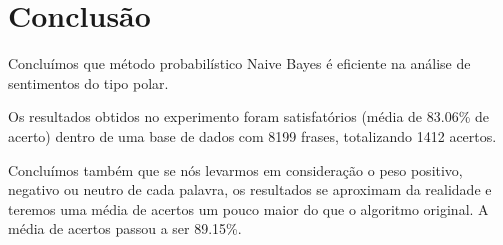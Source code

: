 \documentclass[
article,			%
12pt,				%
a4paper,			%
english,			%
brazil,				%
sumario=tradicional,
twoside
]{abntex2}
\begin{document}
	\section{Conclusão}
	Concluímos que método probabilístico Naive Bayes é eficiente na análise de sentimentos do tipo polar.
	
	Os resultados obtidos no experimento foram satisfatórios (média de 83.06\% de acerto) dentro de uma base de dados com 8199 frases, totalizando 1412 acertos. 
	
	Concluímos também que se nós levarmos em consideração o peso positivo, negativo ou neutro de cada palavra, os resultados se aproximam da realidade e teremos uma média de acertos um pouco maior do que o algoritmo original. A média de acertos passou a ser 89.15\%.
	
	\newpage
	\nocite{sitenaive}
	
	
	
\end{document}
